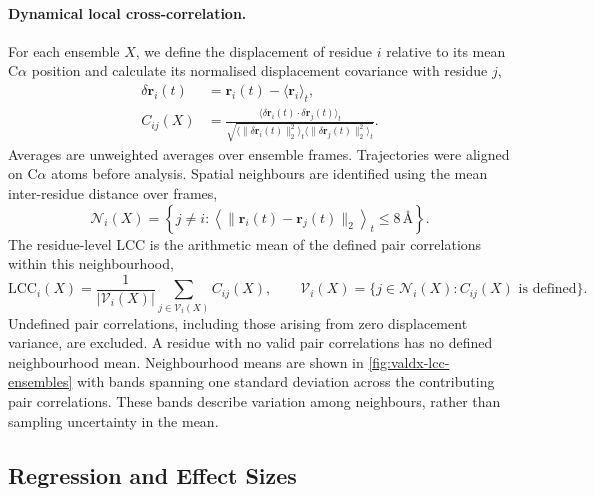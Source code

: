 \paragraph{Dynamical local cross-correlation.}
For each ensemble $X$, we define the displacement of residue $i$ relative to its mean C$\alpha$ position and calculate its normalised displacement covariance with residue $j$,
\begin{equation}
\begin{aligned}
    \delta\mathbf r_i(t)&=\mathbf r_i(t)-\langle\mathbf r_i\rangle_t,\\
    C_{ij}(X)&=
    \frac{\langle\delta\mathbf r_i(t)\cdot\delta\mathbf r_j(t)\rangle_t}
    {\sqrt{\langle\lVert\delta\mathbf r_i(t)\rVert_2^2\rangle_t
    \langle\lVert\delta\mathbf r_j(t)\rVert_2^2\rangle_t}}.
\end{aligned}
    \label{eq:valdx-dynamical-pair-correlation}
\end{equation}
Averages are unweighted averages over ensemble frames. Trajectories were aligned on C$\alpha$ atoms before analysis. Spatial neighbours are identified using the mean inter-residue distance over frames,
\begin{equation}
    \mathcal N_i(X)=\left\{j\ne i:
    \left\langle\lVert\mathbf r_i(t)-\mathbf r_j(t)\rVert_2\right\rangle_t
    \leq8\,\text{\AA}\right\}.
    \label{eq:valdx-lcc-neighbours}
\end{equation}
The residue-level LCC is the arithmetic mean of the defined pair correlations within this neighbourhood,
\begin{equation}
    \mathrm{LCC}_i(X)=\frac{1}{|\mathcal V_i(X)|}
    \sum_{j\in\mathcal V_i(X)}C_{ij}(X),
    \qquad
    \mathcal V_i(X)=\{j\in\mathcal N_i(X):C_{ij}(X)\text{ is defined}\}.
    \label{eq:valdx-lcc}
\end{equation}
Undefined pair correlations, including those arising from zero displacement variance, are excluded. A residue with no valid pair correlations has no defined neighbourhood mean. Neighbourhood means are shown in \cref{fig:valdx-lcc-ensembles} with bands spanning one standard deviation across the contributing pair correlations. These bands describe variation among neighbours, rather than sampling uncertainty in the mean.

\subsection{Regression and Effect Sizes}
\label{app:valdx-statistics}

